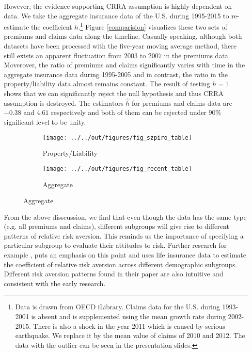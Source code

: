 \documentclass[11pt, a4paper, leqno]{article}
\begin{document}
However, the evidence supporting CRRA assumption is highly dependent on data. We take the aggregate insurance data of the U.S. during 1995-2015 to re-estimate the coefficient $h$.\footnote{Data is drawn from OECD iLibrary. Claims data for the U.S. during 1993-2001 is absent and is supplemented using the mean growth rate during 2002-2015. There is also a shock in the year 2011 which is caused by serious earthquake. We replace it by the mean value of claims of 2010 and 2012. The data with the outlier can be seen in the presentation slides.} Figure \ref{comparision} visualizes these two sets of premiums and claims data along the timeline. Casually speaking, although both datasets have been processed with the five-year moving average method, there still exists an apparent fluctuation from $2003$ to $2007$ in the premiums data. Moverover, the ratio of premiums and claims significantly varies with time in the aggregate insurance data during 1995-2005 and in contrast, the ratio in the property/liability data almost remains constant. The result of testing $h=1$ shows that we can significantly reject the null hypothesis and thus CRRA assumption is destroyed. The estimators $\hat{h}$ for premiums and claims data are $-0.38$ and $4.61$ respectively and both of them can be rejected under $90\%$ significant level to be unity.

\begin{figure}[H]
\centering
{}
\caption{Comparison between Property/Liability Insurance Data and Aggregate Insurance Data}

\begin{subfigure}{0.5\textwidth}
    \centering
    \texttt{[image: ../../out/figures/fig\_szpiro\_table]}
    \caption{Property/Liability}
\end{subfigure}
\begin{subfigure}{0.5\textwidth}
    \centering
    \texttt{[image: ../../out/figures/fig\_recent\_table]}
    \caption{Aggregate}
\end{subfigure}

\end{figure}\label{comparision}

From the above disscussion, we find that even though the data has the same type (e.g. all premiums and claims),  different subgroups will give rise to different patterns of relative risk aversion. This reminds us the importance of specifying a particular subgroup to evaluate their attitudes to risk. Further research for example \citet{halek2001demography}, puts an emphasis on this point and uses life insurance data to estimate the coefficient of relative risk aversion across different demographic subgroups. Different risk aversion patterns found in their paper are also intuitive and consistent with the early research.






\printbibliography
{}





\end{document}
